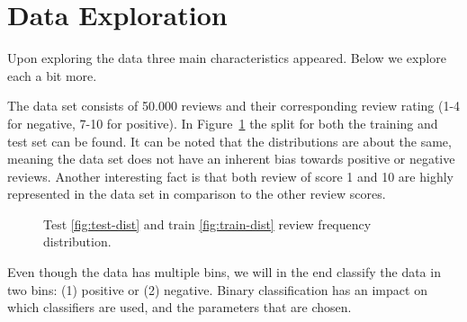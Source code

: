 \section{Data Exploration\label{sec:dataexploration}}

Upon exploring the data three main characteristics appeared. Below we explore each a bit more. 

The data set consists of 50.000 reviews and their corresponding review rating (1-4 for negative, 7-10 for positive). 
In Figure~\ref{fig:data-dist} the split for both the training and test set can be found.
It can be noted that the distributions are about the same, meaning the data set does not have an inherent bias towards positive or negative reviews.
Another interesting fact is that both review of score 1 and 10 are highly represented in the data set in comparison to the other review scores.

\begin{figure}[ht!]
    \centering
    \hfill
  \caption{Test \ref{fig:test-dist} and train \ref{fig:train-dist} review frequency distribution.}
  \label{fig:data-dist} 
\end{figure}

Even though the data has multiple bins, we will in the end classify the data in two bins: (1) positive or (2) negative. Binary classification has an impact on which classifiers are used, and the parameters that are chosen. 

